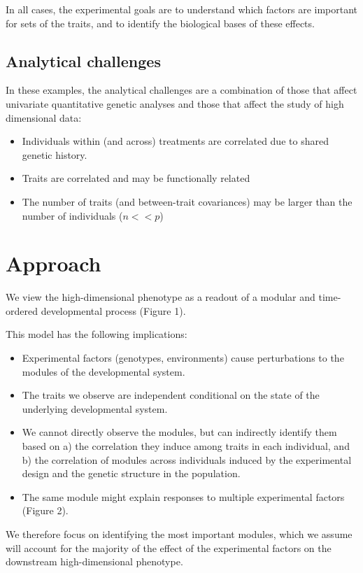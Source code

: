 \documentclass[11pt]{amsart}
\begin{document}
	In all cases, the experimental goals are to understand which factors are important for sets of the traits, and to identify the biological bases of these effects.

\subsection{Analytical challenges}	
	In these examples, the analytical challenges are a combination of those that affect univariate quantitative genetic analyses and those that affect the study of high dimensional data:
\begin{itemize}
\item Individuals within (and across) treatments are correlated due to shared genetic history.
\item Traits are correlated and may be functionally related
\item The number of traits (and between-trait covariances) may be larger than the number of individuals ($n << p$)
\end{itemize}

\section{Approach}
We view the high-dimensional phenotype as a readout of a modular and time-ordered developmental process (Figure 1). 

This model has the following implications:
\begin{itemize}
\item Experimental factors (genotypes, environments) cause perturbations to the modules of the developmental system.
\item The traits we observe are independent conditional on the state of the underlying developmental system.
\item We cannot directly observe the modules, but can indirectly identify them based on a) the correlation they induce among traits in each individual, and b) the correlation of modules across individuals induced by the experimental design and the genetic structure in the population.
\item The same module might explain responses to multiple experimental factors (Figure 2).
\end{itemize}

We therefore focus on identifying the most important modules, which we assume will account for the majority of the effect of the experimental factors on the downstream high-dimensional phenotype. 
\end{document}
